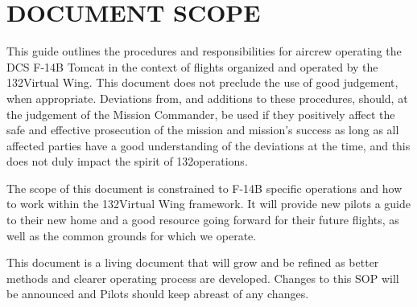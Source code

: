 \section{DOCUMENT SCOPE}

This guide outlines the procedures and responsibilities for aircrew operating
the DCS F-14B Tomcat in the context of flights organized and operated by the
132\nd Virtual Wing. This document does not preclude the use of good judgement,
when appropriate. Deviations from, and additions to these procedures, should,
at the judgement of the Mission Commander, be used if they positively affect
the safe and effective prosecution of the mission and mission's success as long
as all affected parties have a good understanding of the deviations at the
time, and this does not duly impact the spirit of 132\nd operations.

The scope of this document is constrained to F-14B specific operations and how
to work within the 132\nd Virtual Wing framework. It will provide new pilots a
guide to their new home and a good resource going forward for their future
flights, as well as the common grounds for which we operate.

This document is a living document that will grow and be refined as better
methods and clearer operating process are developed. Changes to this SOP will
be announced and Pilots should keep abreast of any changes.
